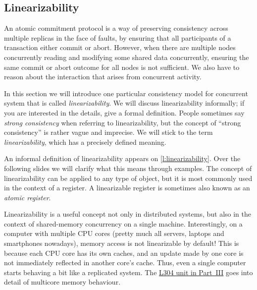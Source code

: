 \subsection{Linearizability}\label{sec:linearizability}

An atomic commitment protocol is a way of preserving consistency across multiple replicas in the face of faults, by ensuring that all participants of a transaction either commit or abort.
However, when there are multiple nodes concurrently reading and modifying some shared data concurrently, ensuring the same commit or abort outcome for all nodes is not sufficient.
We also have to reason about the interaction that arises from concurrent activity.

In this section we will introduce one particular consistency model for concurrent system that is called \emph{linearizability}.
We will discuss linearizability informally; if you are interested in the details, \cite{Herlihy:1990} give a formal definition.
People sometimes say \emph{strong consistency} when referring to linearizability, but the concept of ``strong consistency'' is rather vague and imprecise.
We will stick to the term \emph{linearizability}, which has a precisely defined meaning.

An informal definition of linearizability appears on \autoref{l:linearizability}.
Over the following slides we will clarify what this means through examples.
The concept of linearizability can be applied to any type of object, but it is most commonly used in the context of a register.
A linearizable register is sometimes also known as an \emph{atomic register}.

Linearizability is a useful concept not only in distributed systems, but also in the context of shared-memory concurrency on a single machine.
Interestingly, on a computer with multiple CPU cores (pretty much all servers, laptops and smartphones nowadays), memory access is not linearizable by default!
This is because each CPU core has its own caches, and an update made by one core is not immediately reflected in another core's cache.
Thus, even a single computer starts behaving a bit like a replicated system.
The \href{\multicore}{L304 unit in Part~III} goes into detail of multicore memory behaviour.

